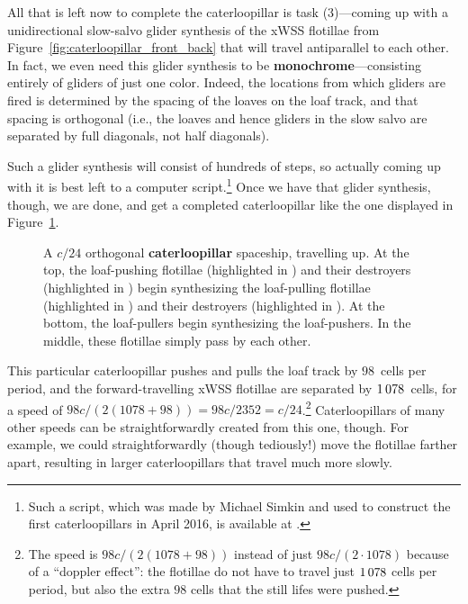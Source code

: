 All that is left now to complete the caterloopillar is task (3)---coming up with a unidirectional slow-salvo glider synthesis of the xWSS flotillae from Figure~\ref{fig:caterloopillar_front_back} that will travel antiparallel to each other. In fact, we even need this glider synthesis to be \textbf{monochrome}---consisting entirely of gliders of just one color. Indeed, the locations from which gliders are fired is determined by the spacing of the loaves on the loaf track, and that spacing is orthogonal (i.e., the loaves and hence gliders in the slow salvo are separated by full diagonals, not half diagonals).

Such a glider synthesis will consist of hundreds of steps, so actually coming up with it is best left to a computer script.\footnote{Such a script, which was made by Michael Simkin and used to construct the first caterloopillars in April 2016, is available at .} Once we have that glider synthesis, though, we are done, and get a completed caterloopillar like the one displayed in Figure~\ref{fig:caterloopillar}.

\begin{figure}[!htbp]
	\centering
	\caption{A $c/24$ orthogonal \textbf{caterloopillar} spaceship, travelling up. At the top, the loaf-pushing flotillae (highlighted in ) and their destroyers (highlighted in ) begin synthesizing the loaf-pulling flotillae (highlighted in ) and their destroyers (highlighted in ). At the bottom, the loaf-pullers begin synthesizing the loaf-pushers. In the middle, these flotillae simply pass by each other.}\label{fig:caterloopillar}
\end{figure}

This particular caterloopillar pushes and pulls the loaf track by $98$~cells per period, and the forward-travelling xWSS flotillae are separated by $1{\,}078$~cells, for a speed of $98c/(2(1078 + 98)) = 98c/2352 = c/24$.\footnote{The speed is $98c/(2(1078 + 98))$ instead of just $98c/(2 \cdot 1078)$ because of a ``doppler effect'': the flotillae do not have to travel just $1{\,}078$ cells per period, but also the extra $98$ cells that the still lifes were pushed.} Caterloopillars of many other speeds can be straightforwardly created from this one, though. For example, we could straightforwardly (though tediously!) move the flotillae farther apart, resulting in larger caterloopillars that travel much more slowly.

